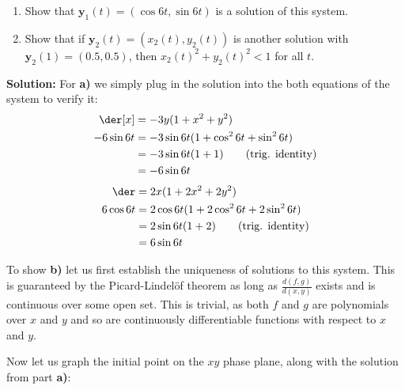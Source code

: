 \documentclass{article}
\begin{document}
\begin{enumerate}[label=\textbf{\alph*)}]
    \item Show that $\mathbf{y}_1(t)=(\cos 6t, \sin 6t)$ is a solution of this system.
    \item Show that if $\mathbf{y}_2(t)=(x_2(t),y_2(t))$ is another solution with $\mathbf{y}_2(1)=(0.5,0.5)$, then $x_2(t)^2+y_2(t)^2<1$ for all $t$.
\end{enumerate}
\bigskip

\noindent\textbf{Solution:} For \textbf{a)} we simply plug in the solution into the both equations of the system to verify it:
\begin{align*}
    \der[x]&=-3y(1+x^2+y^2)\\
    -6\sin 6t&=-3\sin 6t(1+\cos^2 6t+\sin^2 6t)\\
    &=-3\sin 6t(1+1)\tag{trig. identity}\\
    &=-6\sin 6t
\end{align*}
\begin{align*}
    \der&=2x(1+2x^2+2y^2)\\
    6\cos 6t&=2\cos 6t(1+2\cos^2 6t+2\sin^2 6t)\\
    &=2\sin 6t(1+2)\tag{trig. identity}\\
    &=6\sin 6t
\end{align*}

To show \textbf{b)} let us first establish the uniqueness of solutions to this system. This is guaranteed by the Picard-Lindelöf theorem as long as $\frac{d(f,g)}{d(x,y)}$ exists and is continuous over some open set. This is trivial, as both $f$ and $g$ are polynomials over $x$ and $y$ and so are continuously differentiable functions with respect to $x$ and $y$.
\bigskip
\pagebreak

Now let us graph the initial point on the $xy$ phase plane, along with the solution from part \textbf{a)}:

\begin{center}
\end{center}
\end{document}
